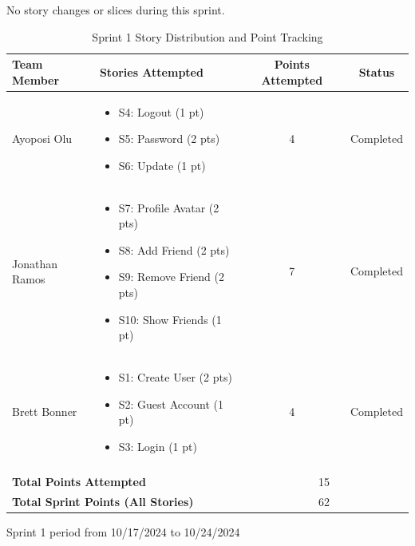 \begin{table}[h]
\centering
No story changes or slices during this sprint.

\caption{Sprint 1 Story Distribution and Point Tracking}
\begin{tabular}{|p{3cm}|p{6cm}|c|c|}
\hline
\textbf{Team Member} & \textbf{Stories Attempted} & \textbf{Points Attempted} & \textbf{Status} \\
\hline
Ayoposi Olu & 
\begin{itemize}
    \item S4: Logout (1 pt)
    \item S5: Password (2 pts)
    \item S6: Update (1 pt)
\end{itemize} & 
4 & 
Completed \\
\hline
Jonathan Ramos & 
\begin{itemize}
    \item S7: Profile Avatar (2 pts)
    \item S8: Add Friend (2 pts)
    \item S9: Remove Friend (2 pts)
    \item S10: Show Friends (1 pt)
\end{itemize}& 
7 & 
Completed \\
\hline
Brett Bonner & 
\begin{itemize}
    \item S1: Create User (2 pts)
    \item S2: Guest Account (1 pt)
    \item S3: Login (1 pt)
\end{itemize} & 
4 & 
Completed \\
\hline
\multicolumn{4}{|c|}{} \\
\hline
\multicolumn{2}{|l|}{\textbf{Total Points Attempted}} & \multicolumn{2}{c|}{15} \\
\hline
\multicolumn{2}{|l|}{\textbf{Total Sprint Points (All Stories)}} & \multicolumn{2}{c|}{62} \\
\hline
\end{tabular}

\vspace{0.5cm}
\begin{center}
\small{Sprint 1 period from 10/17/2024 to 10/24/2024}
\end{center}
\end{table}

